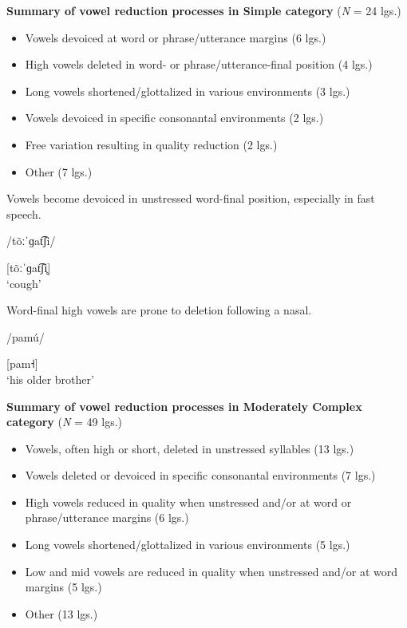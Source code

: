 \ea\label{ex:6.16}
  \textbf{Summary of vowel reduction processes in Simple category} (\textit{N} = 24 lgs.)
\begin{itemize}
\item Vowels devoiced at word or phrase/utterance margins {(6 lgs.)}
\item High vowels deleted in word- or phrase/utterance-final position {(4 lgs.)}
\item Long vowels shortened/glottalized in various environments {(3 lgs.)}
\item Vowels devoiced in specific consonantal environments {(2 lgs.)}
\item Free variation resulting in quality reduction {(2 lgs.)}
\item Other {(7 lgs.)}
\end{itemize}

\ea{}

Vowels become devoiced in unstressed word-final position, especially in fast speech.

/tõːˈɡat͡ʃi/

[tõːˈɡat͡ʃi̥]\\
\glt ‘cough’
\citep[60--61]{Facundes2000}

\ex{}

Word-final high vowels are prone to deletion following a nasal.

/pamú/

[pam{\DejaVuSerif˧}]\\
\glt ‘his older brother’
\citep[369]{Teo2012}
\z
\z

\ea\label{ex:6.17}
  \textbf{Summary of vowel reduction processes in Moderately Complex category} (\textit{N} = 49 lgs.)

\begin{itemize}
\item Vowels, often high or short, deleted in unstressed syllables (13 lgs.)
\item Vowels deleted or devoiced in specific consonantal environments (7 lgs.)
\item High vowels reduced in quality when unstressed and/or at word or phrase/utterance margins (6 lgs.)
\item Long vowels shortened/glottalized in various environments (5 lgs.)
\item Low and mid vowels are reduced in quality when unstressed and/or at word margins (5 lgs.)
\item Other {(13 lgs.)}
\end{itemize}

